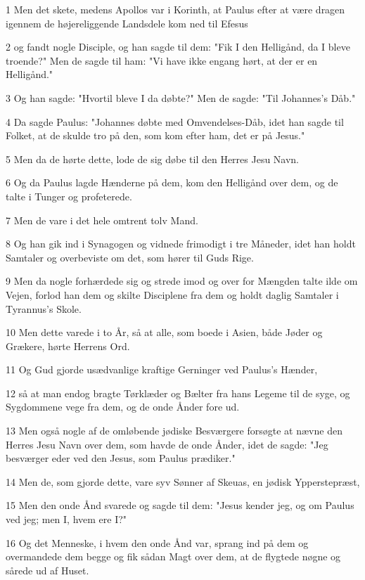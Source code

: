 \par 1 Men det skete, medens Apollos var i Korinth, at Paulus efter at være dragen igennem de højereliggende Landsdele kom ned til Efesus
\par 2 og fandt nogle Disciple, og han sagde til dem: "Fik I den Helligånd, da I bleve troende?" Men de sagde til ham: "Vi have ikke engang hørt, at der er en Helligånd."
\par 3 Og han sagde: "Hvortil bleve I da døbte?" Men de sagde: "Til Johannes's Dåb."
\par 4 Da sagde Paulus: "Johannes døbte med Omvendelses-Dåb, idet han sagde til Folket, at de skulde tro på den, som kom efter ham, det er på Jesus."
\par 5 Men da de hørte dette, lode de sig døbe til den Herres Jesu Navn.
\par 6 Og da Paulus lagde Hænderne på dem, kom den Helligånd over dem, og de talte i Tunger og profeterede.
\par 7 Men de vare i det hele omtrent tolv Mand.
\par 8 Og han gik ind i Synagogen og vidnede frimodigt i tre Måneder, idet han holdt Samtaler og overbeviste om det, som hører til Guds Rige.
\par 9 Men da nogle forhærdede sig og strede imod og over for Mængden talte ilde om Vejen, forlod han dem og skilte Disciplene fra dem og holdt daglig Samtaler i Tyrannus's Skole.
\par 10 Men dette varede i to År, så at alle, som boede i Asien, både Jøder og Grækere, hørte Herrens Ord.
\par 11 Og Gud gjorde usædvanlige kraftige Gerninger ved Paulus's Hænder,
\par 12 så at man endog bragte Tørklæder og Bælter fra hans Legeme til de syge, og Sygdommene vege fra dem, og de onde Ånder fore ud.
\par 13 Men også nogle af de omløbende jødiske Besværgere forsøgte at nævne den Herres Jesu Navn over dem, som havde de onde Ånder, idet de sagde: "Jeg besværger eder ved den Jesus, som Paulus prædiker."
\par 14 Men de, som gjorde dette, vare syv Sønner af Skeuas, en jødisk Ypperstepræst,
\par 15 Men den onde Ånd svarede og sagde til dem: "Jesus kender jeg, og om Paulus ved jeg; men I, hvem ere I?"
\par 16 Og det Menneske, i hvem den onde Ånd var, sprang ind på dem og overmandede dem begge og fik sådan Magt over dem, at de flygtede nøgne og sårede ud af Huset.
